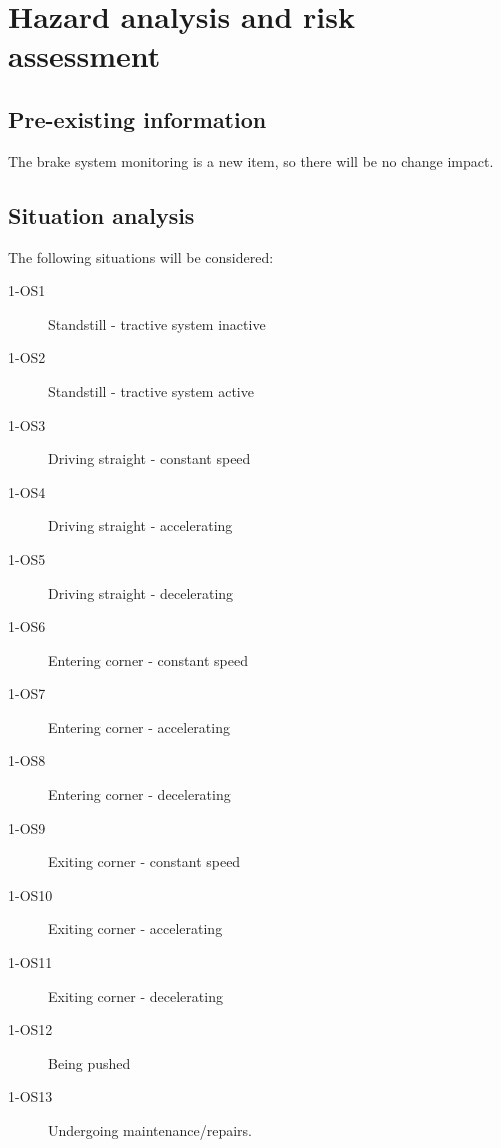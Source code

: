 \section{Hazard analysis and risk assessment}
%
%
% 

\subsection{Pre-existing information}
%
The brake system monitoring is a new item, so there will be no change impact.

\subsection{Situation analysis}
%
%
The following situations will be considered:
\begin{description}
\item [1-OS1] Standstill - tractive system inactive
\item [1-OS2] Standstill - tractive system active
\item [1-OS3] Driving straight - constant speed
\item [1-OS4] Driving straight - accelerating
\item [1-OS5] Driving straight - decelerating
\item [1-OS6] Entering corner - constant speed
\item [1-OS7] Entering corner - accelerating
\item [1-OS8] Entering corner - decelerating
\item [1-OS9] Exiting corner - constant speed
\item [1-OS10] Exiting corner - accelerating
\item [1-OS11] Exiting corner - decelerating
\item [1-OS12] Being pushed
\item [1-OS13] Undergoing maintenance/repairs.
\end{description}


